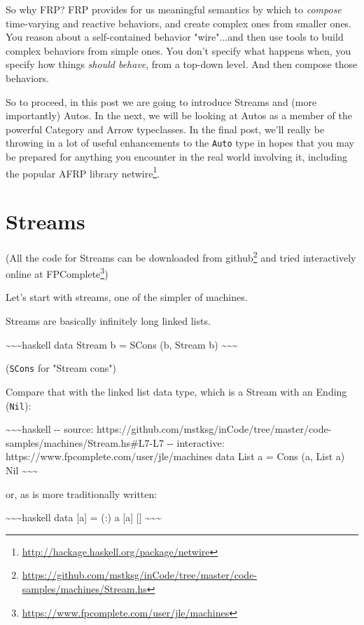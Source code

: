 \documentclass[]{article}
\renewcommand{\href}[2]{#2\footnote{\url{#1}}}
\begin{document}
So why FRP? FRP provides for us meaningful semantics by which to \emph{compose}
time-varying and reactive behaviors, and create complex ones from smaller ones.
You reason about a self-contained behavior "wire"...and then use tools to build
complex behaviors from simple ones. You don't specify what happens when, you
specify how things \emph{should behave}, from a top-down level. And then compose
those behaviors.

So to proceed, in this post we are going to introduce Streams and (more
importantly) Autos. In the next, we will be looking at Autos as a member of the
powerful Category and Arrow typeclasses. In the final post, we'll really be
throwing in a lot of useful enhancements to the \texttt{Auto} type in hopes that
you may be prepared for anything you encounter in the real world involving it,
including the popular AFRP library
\href{http://hackage.haskell.org/package/netwire}{netwire}.

\section{Streams}

(All the code for Streams can be downloaded
\href{https://github.com/mstksg/inCode/tree/master/code-samples/machines/Stream.hs}{from
github} and tried interactively online
\href{https://www.fpcomplete.com/user/jle/machines}{at FPComplete})

Let's start with streams, one of the simpler of machines.

Streams are basically infinitely long linked lists.

\textasciitilde{}\textasciitilde{}\textasciitilde{}haskell data Stream b = SCons
(b, Stream b) \textasciitilde{}\textasciitilde{}\textasciitilde{}

(\texttt{SCons} for "Stream cons")

Compare that with the linked list data type, which is a Stream with an Ending
(\texttt{Nil}):

\textasciitilde{}\textasciitilde{}\textasciitilde{}haskell -\/- source:
https://github.com/mstksg/inCode/tree/master/code-samples/machines/Stream.hs\#L7-L7
-\/- interactive: https://www.fpcomplete.com/user/jle/machines data List a =
Cons (a, List a) \textbar{} Nil
\textasciitilde{}\textasciitilde{}\textasciitilde{}

or, as is more traditionally written:

\textasciitilde{}\textasciitilde{}\textasciitilde{}haskell data {[}a{]} = (:) a
{[}a{]} \textbar{} {[}{]} \textasciitilde{}\textasciitilde{}\textasciitilde{}
\end{document}
